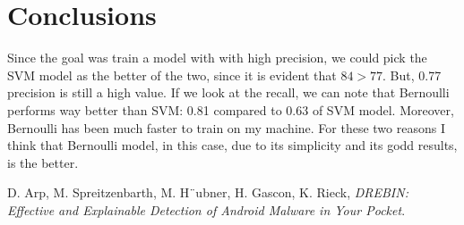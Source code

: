 \documentclass[12pt]{article}
\begin{document}
\section{Conclusions}
Since the goal was train a model with with high precision, we could pick the SVM model as the better of the two, since it is evident that $84 > 77$. But, 0.77 precision is still a high value. If we look at the recall, we can note that Bernoulli performs way better than SVM: 0.81 compared to 0.63 of SVM model. Moreover, Bernoulli has been much faster to train on my machine. For these two reasons I think that Bernoulli model, in this case, due to its simplicity and its godd results, is the better. 

\begin{thebibliography}{10}
	
	D. Arp, M. Spreitzenbarth, M. H¨ubner, H. Gascon, K. Rieck, \textsl{DREBIN: Effective and Explainable Detection of Android Malware in Your Pocket}.
		
\end{thebibliography}
\end{document}
